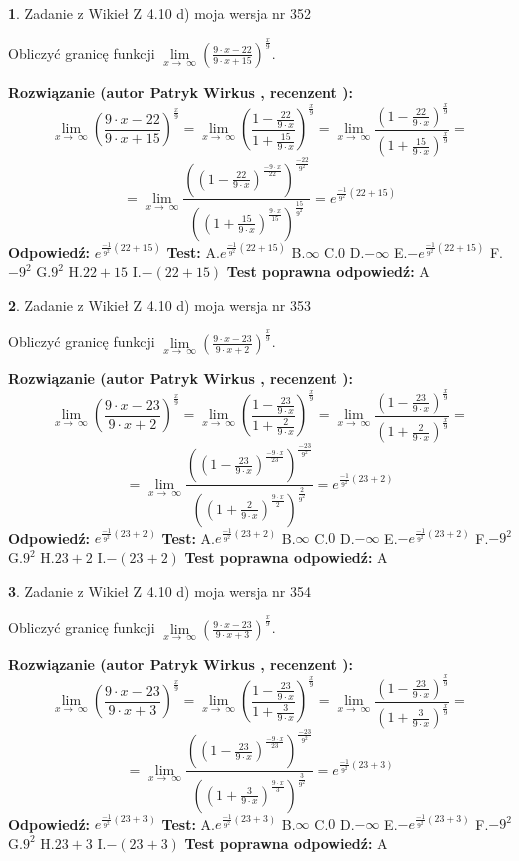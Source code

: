 \documentclass[12pt, a4paper]{article}
\theoremstyle{definition} %
\newtheorem{zad}{}
\newcommand{\zadStart}[1]{\begin{zad}#1\newline}
\newcommand{\zadStop}{\end{zad}}
\newcommand{\rozwStart}[2]{\noindent \textbf{Rozwiązanie (autor #1 , recenzent #2): }\newline}
\newcommand{\rozwStop}{\newline}
\newcommand{\odpStart}{\noindent \textbf{Odpowiedź:}\newline}
\newcommand{\odpStop}{\newline}
\newcommand{\testStart}{\noindent \textbf{Test:}\newline}
\newcommand{\testStop}{\newline}
\newcommand{\kluczStart}{\noindent \textbf{Test poprawna odpowiedź:}\newline}
\newcommand{\kluczStop}{\newline}
\begin{document}
\zadStart{Zadanie z Wikieł Z 4.10 d) moja wersja nr 352}


Obliczyć granicę funkcji  $\lim\limits_{x\to\ \infty}(\frac{9\cdot x-22}{9\cdot x+15})^{\frac{x}{9}}$.
\zadStop
\rozwStart{Patryk Wirkus}{}
$$\lim\limits_{x\to\ \infty}(\frac{9\cdot x-22}{9\cdot x+15})^{\frac{x}{9}} = \lim\limits_{x\to\ \infty}(\frac{1-\frac{22}{9\cdot x}}{1+\frac{15}{9\cdot x}})^{\frac{x}{9}}=\lim\limits_{x\to\ \infty}\frac{(1-\frac{22}{9\cdot x})^{\frac{x}{9}}}{(1+\frac{15}{9\cdot x})^{\frac{x}{9}}}=$$
$$=\lim\limits_{x\to\ \infty}\frac{((1-\frac{22}{9\cdot x})^{\frac{-9\cdot x}{22}})^{\frac{-22}{9^{2}}}}{((1+\frac{15}{9\cdot x})^{\frac{9\cdot x}{15}})^{\frac{15}{9^{2}}}}=e^{\frac{-1}{9^{2}}(22+15)}$$
\rozwStop
\odpStart
$e^{\frac{-1}{9^{2}}(22+15)}$
\odpStop
\testStart
A.$e^{\frac{-1}{9^{2}}(22+15)}$ B.$\infty$ C.$0$ D.$-\infty$ E.$-e^{\frac{-1}{9^{2}}(22+15)}$
F.$-9^{2}$ G.$9^{2}$
H.$22+15$
I.$-(22+15)$
\testStop
\kluczStart
A
\kluczStop



\zadStart{Zadanie z Wikieł Z 4.10 d) moja wersja nr 353}


Obliczyć granicę funkcji  $\lim\limits_{x\to\ \infty}(\frac{9\cdot x-23}{9\cdot x+2})^{\frac{x}{9}}$.
\zadStop
\rozwStart{Patryk Wirkus}{}
$$\lim\limits_{x\to\ \infty}(\frac{9\cdot x-23}{9\cdot x+2})^{\frac{x}{9}} = \lim\limits_{x\to\ \infty}(\frac{1-\frac{23}{9\cdot x}}{1+\frac{2}{9\cdot x}})^{\frac{x}{9}}=\lim\limits_{x\to\ \infty}\frac{(1-\frac{23}{9\cdot x})^{\frac{x}{9}}}{(1+\frac{2}{9\cdot x})^{\frac{x}{9}}}=$$
$$=\lim\limits_{x\to\ \infty}\frac{((1-\frac{23}{9\cdot x})^{\frac{-9\cdot x}{23}})^{\frac{-23}{9^{2}}}}{((1+\frac{2}{9\cdot x})^{\frac{9\cdot x}{2}})^{\frac{2}{9^{2}}}}=e^{\frac{-1}{9^{2}}(23+2)}$$
\rozwStop
\odpStart
$e^{\frac{-1}{9^{2}}(23+2)}$
\odpStop
\testStart
A.$e^{\frac{-1}{9^{2}}(23+2)}$ B.$\infty$ C.$0$ D.$-\infty$ E.$-e^{\frac{-1}{9^{2}}(23+2)}$
F.$-9^{2}$ G.$9^{2}$
H.$23+2$
I.$-(23+2)$
\testStop
\kluczStart
A
\kluczStop



\zadStart{Zadanie z Wikieł Z 4.10 d) moja wersja nr 354}


Obliczyć granicę funkcji  $\lim\limits_{x\to\ \infty}(\frac{9\cdot x-23}{9\cdot x+3})^{\frac{x}{9}}$.
\zadStop
\rozwStart{Patryk Wirkus}{}
$$\lim\limits_{x\to\ \infty}(\frac{9\cdot x-23}{9\cdot x+3})^{\frac{x}{9}} = \lim\limits_{x\to\ \infty}(\frac{1-\frac{23}{9\cdot x}}{1+\frac{3}{9\cdot x}})^{\frac{x}{9}}=\lim\limits_{x\to\ \infty}\frac{(1-\frac{23}{9\cdot x})^{\frac{x}{9}}}{(1+\frac{3}{9\cdot x})^{\frac{x}{9}}}=$$
$$=\lim\limits_{x\to\ \infty}\frac{((1-\frac{23}{9\cdot x})^{\frac{-9\cdot x}{23}})^{\frac{-23}{9^{2}}}}{((1+\frac{3}{9\cdot x})^{\frac{9\cdot x}{3}})^{\frac{3}{9^{2}}}}=e^{\frac{-1}{9^{2}}(23+3)}$$
\rozwStop
\odpStart
$e^{\frac{-1}{9^{2}}(23+3)}$
\odpStop
\testStart
A.$e^{\frac{-1}{9^{2}}(23+3)}$ B.$\infty$ C.$0$ D.$-\infty$ E.$-e^{\frac{-1}{9^{2}}(23+3)}$
F.$-9^{2}$ G.$9^{2}$
H.$23+3$
I.$-(23+3)$
\testStop
\kluczStart
A
\kluczStop
\end{document}
